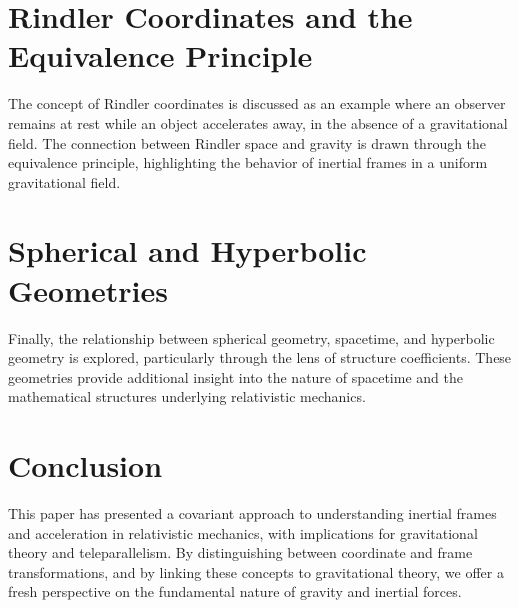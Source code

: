 \documentclass[12pt]{article}
\begin{document}
\section{Rindler Coordinates and the Equivalence Principle}
The concept of Rindler coordinates is discussed as an example where an observer remains at rest while an object accelerates away, in the absence of a gravitational field. The connection between Rindler space and gravity is drawn through the equivalence principle, highlighting the behavior of inertial frames in a uniform gravitational field.

\section{Spherical and Hyperbolic Geometries}
Finally, the relationship between spherical geometry, spacetime, and hyperbolic geometry is explored, particularly through the lens of structure coefficients. These geometries provide additional insight into the nature of spacetime and the mathematical structures underlying relativistic mechanics.

\section{Conclusion}
This paper has presented a covariant approach to understanding inertial frames and acceleration in relativistic mechanics, with implications for gravitational theory and teleparallelism. By distinguishing between coordinate and frame transformations, and by linking these concepts to gravitational theory, we offer a fresh perspective on the fundamental nature of gravity and inertial forces.
\end{document}
